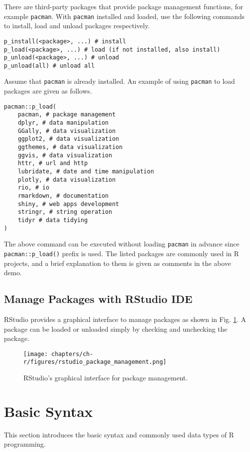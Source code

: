 There are third-party packages that provide package management functions, for example \verb|pacman|. With \verb|pacman| installed and loaded, use the following commands to install, load and unload packages respectively.
\begin{lstlisting}
p_install(<package>, ...) # install
p_load(<package>, ...) # load (if not installed, also install)
p_unload(<package>, ...) # unload
p_unload(all) # unload all
\end{lstlisting}
Assume that \verb|pacman| is already installed. An example of using \verb|pacman| to load packages are given as follows.
\begin{lstlisting}
pacman::p_load(
	pacman, # package management
	dplyr, # data manipulation
	GGally, # data visualization
	ggplot2, # data visualization
	ggthemes, # data visualization
	ggvis, # data visualization
	httr, # url and http
	lubridate, # date and time manipulation
	plotly, # data visualization
	rio, # io
	rmarkdown, # documentation
	shiny, # web apps development
	stringr, # string operation
	tidyr # data tidying
)
\end{lstlisting}
The above command can be executed without loading \verb|pacman| in advance since \verb|pacman::p_load()| prefix is used. The listed packages are commonly used in R projects, and a brief explanation to them is given as comments in the above demo. 

\subsection{Manage Packages with RStudio IDE}

RStudio provides a graphical interface to manage packages as shown in Fig. \ref{ch:r1:fig:rstudio_package_management}. A package can be loaded or unloaded simply by checking and unchecking the package.
\begin{figure}
\centering
\texttt{[image: chapters/ch-r/figures/rstudio\_package\_management.png]}
\caption{RStudio's graphical interface for package management.} \label{ch:r1:fig:rstudio_package_management}
\end{figure}

\section{Basic Syntax} \label{ch:r1:sec:rprogramming}

This section introduces the basic syntax and commonly used data types of R programming.

